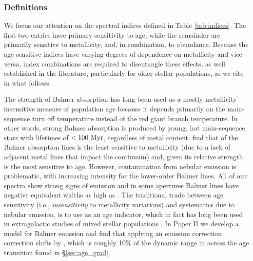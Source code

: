 \subsubsection{Definitions}
\label{sec:index_defn}

We focus our attention on the spectral indices defined in Table
\ref{tab:indices}. The first two entries have primary sensitivity to
age, while the remainder are primarily sensitive to metallicity, and,
in combination, to abundance. Because the age-sensitive indices have
varying degrees of dependence on metallicity and vice versa, index
combinations are required to disentangle these effects, as well
established in the literature, particularly for older stellar
populations, as we cite in what follows.

The strength of Balmer absorption has long been used as a mostly
metallicity-insensitive measure of population age because it depends
primarily on the main-sequence turn off temperature instead of the red
giant branch temperature. In other words, strong Balmer absorption is
produced by young, hot main-sequence stars with lifetimes of
$<100~\mathrm{Myr} $, regardless of metal content. \citet{Worthey97} find
that of the Balmer absorption lines \HB is the least sensitive to
metallicity (due to a lack of adjacent metal lines that impact the
continuum) and, given its relative strength, is the most sensitive to
age.  However, contamination from nebular emission is problematic,
with increasing intensity for the lower-order Balmer lines.  All of
our spectra show strong signs of \Ha emission and in some apertures
Balmer lines have negative equivalent widths as high as \Hg.  The
traditional trade between age sensitivity (i.e., \emph{insensitivity}
to metallicity variations) and systematics due to nebular emission, is
to use \Hda \citep{Worthey97} as an age indicator, which in fact has
long been used in extragalactic studies of mixed stellar populations
\citep[e.g.,][]{Couch87}. In Paper II we develop a model for Balmer
emission and find that applying an emission correction correction
shifts \Hda by , which is roughly 10\% of the
dynamic range in \Hda across the age transition found in
\S\ref{sec:age_grad}.


